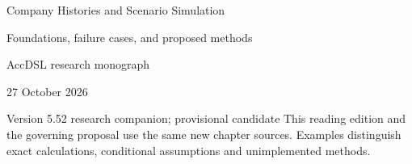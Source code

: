 \documentclass[11pt,a4paper]{report}
\begin{document}
\hypersetup{pageanchor=false}
\begin{titlepage}
{\Huge Company Histories and Scenario Simulation\par}
\vspace{12mm}
{\Large Foundations, failure cases, and proposed methods\par}
\vspace{8mm}
AccDSL research monograph\par 27 October 2026\par Version 5.52 research companion; provisional candidate
\vfill
This reading edition and the governing proposal use the same new chapter sources. Examples distinguish exact calculations, conditional assumptions and unimplemented methods.
\end{titlepage}
\hypersetup{pageanchor=true}
\tableofcontents
\clearpage{}


























\clearpage\label{sim:body-end}

\begingroup\raggedright
\endgroup
\end{document}
